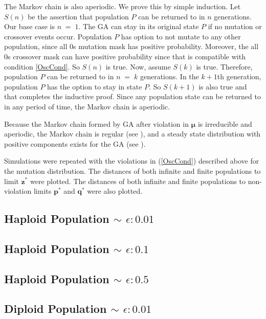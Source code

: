The Markov chain is also aperiodic. We prove this by simple induction. 
Let $S(n)$ be the assertion that population $P$ can be returned to in $n$ generations. 
Our base case is $n \;=\; 1$. The GA can stay in its original state $P$ if no mutation or crossover events occur. 
Population $P$ has option to not mutate to any other population, since all $0$s mutation mask 
has positive probability. Moreover, the all $0$s crossover mask can have positive probability since 
that is compatible with condition \ref{OscCond}.
So $S(n)$ is true. Now, assume $S(k)$ is true. Therefore, population $P$ can be returned to in $n \;= \;k$ generations. 
In the $k+1$th generation, population $P$ has the option to stay in state $P$. 
So $S(k+1)$ is also true and that completes the inductive proof. 
Since any population state can be returned to in any period of time, the Markov chain is aperiodic. 

Because the Markov chain formed by GA after violation in $\bm{\mu}$ is irreducible and aperiodic, 
the Markov chain is regular (see \cite{Iosifescu1980}), and a steady state distribution 
with positive components exists for the GA (see \cite{Minc1988}).   

Simulations were repeated with the violations in (\ref{OscCond}) described above for the mutation distribution.
The distances of both infinite and finite populations to limit $\bm{z}^\ast$ were plotted. 
The distances of both infinite and finite populations to non-violation limits $\bm{p}^\ast$ and $\bm{q}^\ast$ were also plotted.

\subsection{Haploid Population $\mathtt{\sim}$ $\epsilon: 0.01$}

\subsection{Haploid Population $\mathtt{\sim}$ $\epsilon: 0.1$}

\subsection{Haploid Population $\mathtt{\sim}$ $\epsilon: 0.5$}

\clearpage
\subsection{Diploid Population $\mathtt{\sim}$ $\epsilon: 0.01$}

